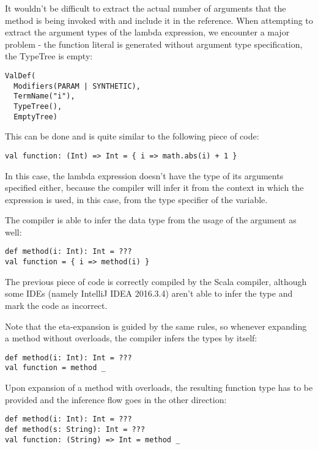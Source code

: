  It wouldn't be difficult to extract the actual number of arguments that the method is being invoked with and include it in the reference. When attempting to extract the argument types of the lambda expression, we encounter a major problem - the function literal is generated without argument type specification, the TypeTree is empty:

\lstset{style=Dump}
\begin{lstlisting}
ValDef(
  Modifiers(PARAM | SYNTHETIC), 
  TermName("i"), 
  TypeTree(), 
  EmptyTree)
\end{lstlisting}

This can be done and is quite similar to the following piece of code:

\lstset{style=Scala}
\begin{lstlisting}
val function: (Int) => Int = { i => math.abs(i) + 1 }
\end{lstlisting}

In this case, the lambda expression doesn't have the type of its arguments specified either, because the compiler will infer it from the context in which the expression is used, in this case, from the type specifier of the variable.

The compiler is able to infer the data type from the usage of the argument as well:
\lstset{style=Scala}
\begin{lstlisting}
def method(i: Int): Int = ???
val function = { i => method(i) }
\end{lstlisting}

The previous piece of code is correctly compiled by the Scala compiler, although some IDEs (namely IntelliJ IDEA 2016.3.4) aren't able to infer the type and mark the code as incorrect.

Note that the eta-expansion is guided by the same rules, so whenever expanding a method without overloads, the compiler infers the types by itself:
\lstset{style=Scala}
\begin{lstlisting}
def method(i: Int): Int = ???
val function = method _
\end{lstlisting}

Upon expansion of a method with overloads, the resulting function type has to be provided and the inference flow goes in the other direction:
\lstset{style=Scala}
\begin{lstlisting}
def method(i: Int): Int = ???
def method(s: String): Int = ???
val function: (String) => Int = method _
\end{lstlisting}

